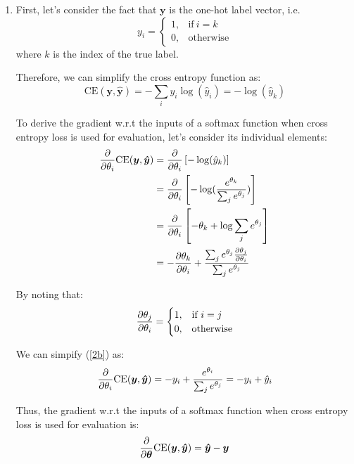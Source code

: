 \documentclass[10pt,reqno]{amsart}
\begin{document}
\begin{enumerate}[topsep=0pt,itemsep=2ex,partopsep=1ex,parsep=1ex]
\begin{enumerate}
  \item
    First, let's consider the fact that $\bm{y}$ is the one-hot label vector, i.e.
    \begin{equation*}
      y_i = 
      \begin{cases}
        1, & \text{if}\ i=k \\
        0, & \text{otherwise}
      \end{cases}
    \end{equation*}
    where $k$ is the index of the true label. 
    
    Therefore, we can simplify the cross entropy function as:
    \begin{equation*}
      \text{CE}(\bm{y}, \bm{\hat{y}})
        = - \sum_i y_i \log(\hat{y}_i)
        = - \log(\hat{y}_k)
    \end{equation*}

    To derive the gradient w.r.t the inputs of a softmax function when cross entropy loss
    is used for evaluation, let's consider its individual elements:
    \begin{align}
      \frac{\partial}{\partial \theta_i} \text{CE}(\bm{y}, \bm{\hat{y}})
      &= \frac{\partial}{\partial \theta_i} \left[ - \log(\hat{y}_k) \right] \nonumber \\
      &= \frac{\partial}{\partial \theta_i} \left[ - \log(\frac{e^{\theta_k}}{\sum_j e^{\theta_j}}) \right] \nonumber \\
      &= \frac{\partial}{\partial \theta_i} \left[ -\theta_k + \log \sum_j e^{\theta_j} \right] \nonumber \\
      &= - \frac{\partial \theta_k}{\partial \theta_i} + \frac{\sum_j e^{\theta_j} \frac{\partial \theta_j}{\partial \theta_i}}{\sum_j e^{\theta_j}} \label{2b}
    \end{align}

    By noting that:
    \begin{equation*}
      \frac{\partial \theta_j}{\partial \theta_i} = 
      \begin{cases}
        1, & \text{if}\ i=j \\
        0, & \text{otherwise}
      \end{cases}
    \end{equation*}

    We can simpify (\ref{2b}) as:
    \begin{equation*}
      \frac{\partial}{\partial \theta_i} \text{CE}(\bm{y}, \bm{\hat{y}})
      = - y_i + \frac{e^{\theta_i}}{\sum_j e^{\theta_j}} 
      = - y_i + \hat{y}_i 
    \end{equation*}

    Thus, the gradient w.r.t the inputs of a softmax function when cross entropy loss
    is used for evaluation is:
    \begin{equation*}
      \frac{\partial}{\partial \bm{\theta}} \text{CE}(\bm{y}, \bm{\hat{y}}) = \bm{\hat{y}} - \bm{y}
    \end{equation*}


\end{enumerate}
\end{enumerate}
\end{document}
